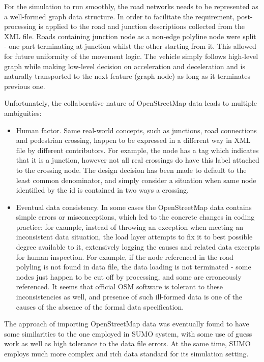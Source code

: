 For the simulation to run smoothly, the road networks needs to be represented as a well-formed graph data structure. In order to facilitate the requirement, post-processing is applied to the road and junction descriptions collected from the XML file. Roads containing junction node as a non-edge polyline node were split - one part terminating at junction whilst the other starting from it. This allowed for future uniformity of the movement logic. The vehicle simply follows high-level graph while making low-level decision on acceleration and deceleration and is naturally transported to the next feature (graph node) as long as it terminates previous one.

Unfortunately, the collaborative nature of OpenStreetMap data leads to multiple ambiguities:
\begin{itemize}
    \item Human factor. Same real-world concepts, such as junctions, road connections and pedestrian crossing, happen to be expressed in a different way in XML file by different contributors. For example, the node has a tag which indicates that it is a junction, however not all real crossings do have this label attached to the crossing node. The design decision has been made to default to the least common denominator, and simply consider a situation when same node identified by the id is contained in two ways a crossing.
    \item Eventual data consistency. In some cases the OpenStreetMap data contains simple errors or misconceptions, which led to the concrete changes in coding practice: for example, instead of throwing an exception when meeting an inconsistent data situation, the load layer attempts to fix it to best possible degree available to it, extensively logging the causes and related data excerpts for human inspection. For example, if the node referenced in the road polyling is not found in data file, the data loading is not terminated - some nodes just happen to be cut off by processing, and some are erroneously referenced. It seems that official OSM software is tolerant to these inconsistencies as well, and presence of such ill-formed data is one of the causes of the absence of the formal data specification.
\end{itemize}

The approach of importing OpenStreetMap data was eventually found to have some similarities to the one employed in SUMO system, with some use of guess work as well as high tolerance to the data file errors. At the same time, SUMO employs much more complex and rich data standard for its simulation setting.

